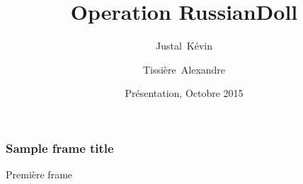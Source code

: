 \documentclass{beamer}
\title[Operation RussianDoll] %
{Operation RussianDoll}
\subtitle{}
\author[Justal K\'evin, Tissi\`ere Alexandre] %
{Justal~K\'evin\inst{1} \and Tissi\`ere~Alexandre\inst{2}}
\institute[VFU] %
{
  \inst{1}%
  Polytech'Nice Sophia\\
  SI5 - IHM
  \and
  \inst{2}%
  Polytech'Nice Sophia\\
  SI5 - IHM
}
\date[VLC 2013] %
{Pr\'esentation, Octobre 2015}
\begin{document}
 
\frame{\titlepage}
 
\begin{frame}
\frametitle{Sample frame title}
Premi\`ere frame
\end{frame}
 
\end{document}
